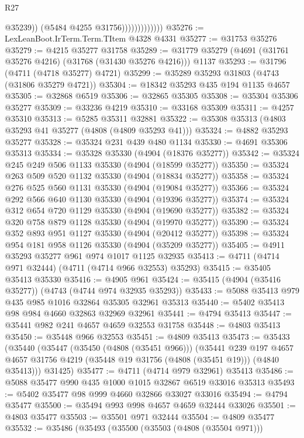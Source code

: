 \begin{lexlean}{R27}
\begin{coremodule}
                                @35239))
                            (@5484 @4255 @31756)))))))))))))
@35276 := LexLeanBoot.IrTerm.Term.TItem @4328 @4331
@35277 := @31753 @35276
@35279 := @4215 @35277 @31758
@35289 := @31779 @35279 (@4691 (@31761 @35276 @4216) (@31768 (@31430 @35276 @4216))) @1137
@35293 := @31796 (@4711 (@4718 @35277) @4721)
@35299 := @35289 @35293 @31803 (@4743 (@31806 @35279 @4721))
@35304 := @18342 @35293 @435 @194 @1135 @4657
@35305 := @32868 @6519
@35306 := @32865 @35305
@35308 := @35304 @35306 @35277
@35309 := @33236 @4219
@35310 := @33168 @35309
@35311 := @4257 @35310
@35313 := @5285 @35311 @32881
@35322 := @35308 @35313 (@4803 @35293 @41 @35277 (@4808 (@4809 @35293 @41)))
@35324 := @4882 @35293 @35277
@35328 := @35324 @231 @439 @480 @1134
@35330 := @4691 @35306 @35313
@35334 := @35328 @35330 (@4904 (@18376 @35277))
@35342 := @35324 @245 @249 @506 @1133 @35330 (@4904 (@18599 @35277))
@35350 := @35324 @263 @509 @520 @1132 @35330 (@4904 (@18834 @35277))
@35358 := @35324 @276 @525 @560 @1131 @35330 (@4904 (@19084 @35277))
@35366 := @35324 @292 @566 @640 @1130 @35330 (@4904 (@19396 @35277))
@35374 := @35324 @312 @654 @720 @1129 @35330 (@4904 (@19690 @35277))
@35382 := @35324 @320 @758 @879 @1128 @35330 (@4904 (@19970 @35277))
@35390 := @35324 @352 @893 @951 @1127 @35330 (@4904 (@20412 @35277))
@35398 := @35324 @954 @181 @958 @1126 @35330 (@4904 (@35209 @35277))
@35405 := @4911 @35293 @35277 @961 @974 @1017 @1125 @32935
@35413 := @4711 (@4714 @971 @32444) (@4711 (@4714 @966 @32553) @35293)
@35415 := @35405 @35413 @35330
@35416 := @4905 @961
@35424 := @35415 (@4904 (@35416 @35277)) (@4743 (@4744 @974 @32935 @35293))
@35433 := @5088 @35413 @979 @435 @985 @1016 @32864 @35305 @32961 @35313
@35440 := @5402 @35413 @98 @984 @4660 @32863 @32969 @32961
@35441 := @4794 @35413
@35447 := @35441 @982 @241 @4657 @4659 @32553 @31758
@35448 := @4803 @35413
@35450 := @35448 @966 @32553
@35451 := @4809 @35413
@35473 := @35433
    (@35440
      (@35447
        (@35450 (@4808 (@35451 @966)))
        (@35441
          @239
          @197
          @4657
          @4657
          @31756
          @4219
          (@35448 @19 @31756 (@4808 (@35451 @19)))
          (@4840 @35413)))
      @31425)
@35477 := @4711 (@4714 @979 @32961) @35413
@35486 := @5088 @35477 @990 @435 @1000 @1015 @32867 @6519 @33016 @35313
@35493 := @5402 @35477 @98 @999 @4660 @32866 @33027 @33016
@35494 := @4794 @35477
@35500 := @35494 @993 @998 @4657 @4659 @32444 @33026
@35501 := @4803 @35477
@35503 := @35501 @971 @32444
@35504 := @4809 @35477
@35532 := @35486
    (@35493
      (@35500
        (@35503 (@4808 (@35504 @971)))

\end{coremodule}
\end{lexlean}

